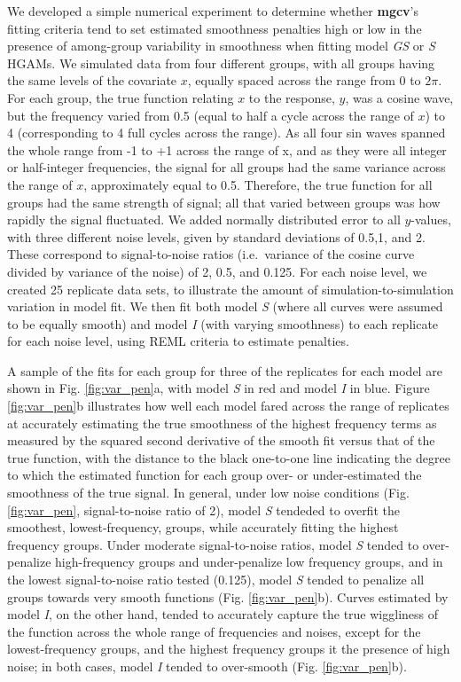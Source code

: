 \documentclass[12pt]{article}
\begin{document}
We developed a simple numerical experiment to determine whether
\textbf{mgcv}'s fitting criteria tend to set estimated smoothness
penalties high or low in the presence of among-group variability in
smoothness when fitting model \emph{GS} or \emph{S} HGAMs. We simulated
data from four different groups, with all groups having the same levels
of the covariate \(x\), equally spaced across the range from 0 to
\(2\pi\). For each group, the true function relating \(x\) to the
response, \(y\), was a cosine wave, but the frequency varied from 0.5
(equal to half a cycle across the range of \(x\)) to 4 (corresponding to
4 full cycles across the range). As all four sin waves spanned the whole
range from -1 to +1 across the range of x, and as they were all integer
or half-integer frequencies, the signal for all groups had the same
variance across the range of \(x\), approximately equal to 0.5.
Therefore, the true function for all groups had the same strength of
signal; all that varied between groups was how rapidly the signal
fluctuated. We added normally distributed error to all \(y\)-values,
with three different noise levels, given by standard deviations of
0.5,1, and 2. These correspond to signal-to-noise ratios (i.e.~variance
of the cosine curve divided by variance of the noise) of 2, 0.5, and
0.125. For each noise level, we created 25 replicate data sets, to
illustrate the amount of simulation-to-simulation variation in model
fit. We then fit both model \emph{S} (where all curves were assumed to
be equally smooth) and model \emph{I} (with varying smoothness) to each
replicate for each noise level, using REML criteria to estimate
penalties.

A sample of the fits for each group for three of the replicates for each
model are shown in Fig. \ref{fig:var_pen}a, with model \emph{S} in red
and model \emph{I} in blue. Figure \ref{fig:var_pen}b illustrates how
well each model fared across the range of replicates at accurately
estimating the true smoothness of the highest frequency terms as
measured by the squared second derivative of the smooth fit versus that
of the true function, with the distance to the black one-to-one line
indicating the degree to which the estimated function for each group
over- or under-estimated the smoothness of the true signal. In general,
under low noise conditions (Fig. \ref{fig:var_pen}, signal-to-noise
ratio of 2), model \emph{S} tendeded to overfit the smoothest,
lowest-frequency, groups, while accurately fitting the highest frequency
groups. Under moderate signal-to-noise ratios, model \emph{S} tended to
over-penalize high-frequency groups and under-penalize low frequency
groups, and in the lowest signal-to-noise ratio tested (0.125), model
\emph{S} tended to penalize all groups towards very smooth functions
(Fig. \ref{fig:var_pen}b). Curves estimated by model \emph{I}, on the
other hand, tended to accurately capture the true wiggliness of the
function across the whole range of frequencies and noises, except for
the lowest-frequency groups, and the highest frequency groups it the
presence of high noise; in both cases, model \emph{I} tended to
over-smooth (Fig. \ref{fig:var_pen}b).
\end{document}
